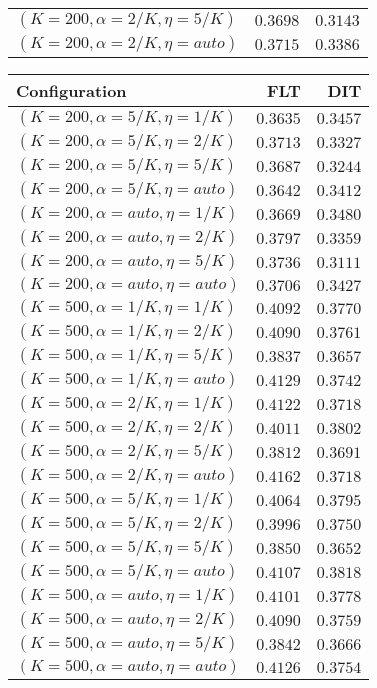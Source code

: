 \begin{table}
\begin{spacing}{1.2}
{\begin{tabular}{lrr}
   $(K=200,\alpha=2/K,\eta=5/K)$ & $0.3698$ & $0.3143$ \\
  $(K=200,\alpha=2/K,\eta=auto)$ & $0.3715$ & $0.3386$ \\
\bottomrule
\end{tabular}
} \hfill \parbox{.45\linewidth}{\centering \begin{tabular}{lrr}
\toprule
                   Configuration &           FLT &           DIT \\
\midrule
   $(K=200,\alpha=5/K,\eta=1/K)$ &      $0.3635$ &      $0.3457$ \\
   $(K=200,\alpha=5/K,\eta=2/K)$ &      $0.3713$ &      $0.3327$ \\
   $(K=200,\alpha=5/K,\eta=5/K)$ &      $0.3687$ &      $0.3244$ \\
  $(K=200,\alpha=5/K,\eta=auto)$ &      $0.3642$ &      $0.3412$ \\
  $(K=200,\alpha=auto,\eta=1/K)$ &      $0.3669$ &      $0.3480$ \\
  $(K=200,\alpha=auto,\eta=2/K)$ &      $0.3797$ &      $0.3359$ \\
  $(K=200,\alpha=auto,\eta=5/K)$ &      $0.3736$ &      $0.3111$ \\
 $(K=200,\alpha=auto,\eta=auto)$ &      $0.3706$ &      $0.3427$ \\
   $(K=500,\alpha=1/K,\eta=1/K)$ &      $0.4092$ &      $0.3770$ \\
   $(K=500,\alpha=1/K,\eta=2/K)$ &      $0.4090$ &      $0.3761$ \\
   $(K=500,\alpha=1/K,\eta=5/K)$ &      $0.3837$ &      $0.3657$ \\
  $(K=500,\alpha=1/K,\eta=auto)$ &      $0.4129$ &      $0.3742$ \\
   $(K=500,\alpha=2/K,\eta=1/K)$ &      $0.4122$ &      $0.3718$ \\
   $(K=500,\alpha=2/K,\eta=2/K)$ &      $0.4011$ &      $0.3802$ \\
   $(K=500,\alpha=2/K,\eta=5/K)$ &      $0.3812$ &      $0.3691$ \\
  $(K=500,\alpha=2/K,\eta=auto)$ & $\bm{0.4162}$ &      $0.3718$ \\
   $(K=500,\alpha=5/K,\eta=1/K)$ &      $0.4064$ &      $0.3795$ \\
   $(K=500,\alpha=5/K,\eta=2/K)$ &      $0.3996$ &      $0.3750$ \\
   $(K=500,\alpha=5/K,\eta=5/K)$ &      $0.3850$ &      $0.3652$ \\
  $(K=500,\alpha=5/K,\eta=auto)$ &      $0.4107$ & $\bm{0.3818}$ \\
  $(K=500,\alpha=auto,\eta=1/K)$ &      $0.4101$ &      $0.3778$ \\
  $(K=500,\alpha=auto,\eta=2/K)$ &      $0.4090$ &      $0.3759$ \\
  $(K=500,\alpha=auto,\eta=5/K)$ &      $0.3842$ &      $0.3666$ \\
 $(K=500,\alpha=auto,\eta=auto)$ &      $0.4126$ &      $0.3754$ \\
\bottomrule
\end{tabular}
}
\end{spacing}
\end{table}
